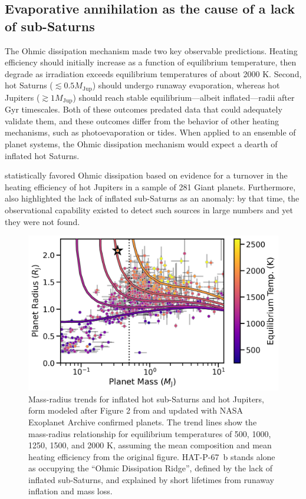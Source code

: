 \documentclass[twocolumn]{aastex631}
\begin{document}
\subsection{Evaporative annihilation as the cause of a lack of sub-Saturns}
The Ohmic dissipation mechanism made two key observable predictions.  Heating efficiency should initially increase as a function of equilibrium temperature, then degrade as irradiation exceeds equilibrium temperatures of about 2000 K.  Second, hot Saturns ($\lesssim0.5 M_\mathrm{Jup}$) should undergo runaway evaporation, whereas hot Jupiters ($\gtrsim 1 M_\mathrm{Jup}$) should reach stable equilibrium---albeit inflated---radii after Gyr timescales.  Both of these outcomes predated data that could adequately validate them, and these outcomes differ from the behavior of other heating mechanisms, such as photoevaporation or tides.  When applied to an ensemble of planet systems, the Ohmic dissipation mechanism would expect a dearth of inflated hot Saturns.

\citet{2018AJ....155..214T} statistically favored Ohmic dissipation based on evidence for a turnover in the heating efficiency of hot Jupiters in a sample of 281 Giant planets.  Furthermore, \citet{2018AJ....155..214T} also highlighted the lack of inflated sub-Saturns as an anomaly: by that time, the observational capability existed to detect such sources in large numbers and yet they were not found.

\begin{figure}
    \includegraphics[width=\linewidth]{figures/tf2018_fig2_update2023_HAT.png}
    \caption{Mass-radius trends for inflated hot sub-Saturns and hot Jupiters, form modeled after Figure 2 from \citet{2018AJ....155..214T} and updated with NASA Exoplanet Archive confirmed planets.  The trend lines show the mass-radius relationship for equilibrium temperatures of 500, 1000, 1250, 1500, and 2000 K, assuming the mean composition and mean heating efficiency from the original figure.  HAT-P-67~b stands alone as occupying the ``Ohmic Dissipation Ridge'', defined by the lack of inflated sub-Saturns, and explained by short lifetimes from runaway inflation and mass loss.}
    \label{fig:ThornFortUpdated}
\end{figure}
\end{document}
